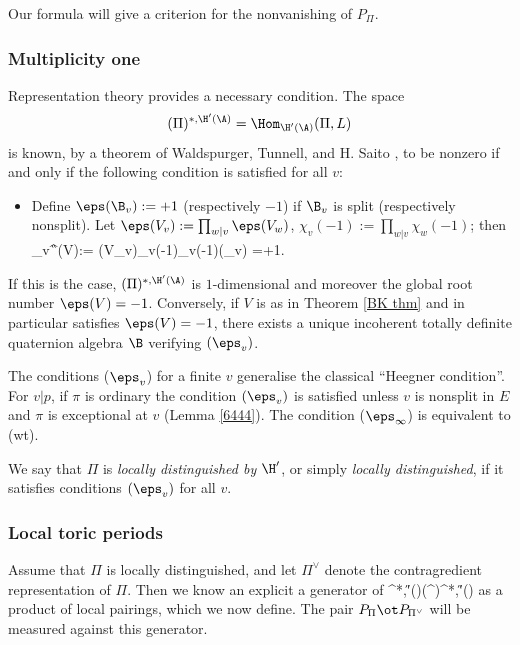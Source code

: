 Our formula will give a criterion for the nonvanishing of  $P_{\Pi}$.





\subsubsection{Multiplicity one} Representation theory provides a necessary condition.  The space
$$(\Pi)^{*,\H'(\A)}=\Hom_{\H'(\A)} (\Pi, L)$$
 is known, by a theorem of Waldspurger,  Tunnell, and H. Saito \cite{tunnell,saito-h}, to be nonzero if and  only if
the following condition is satisfied for all $v$:
\begin{itemize}
\item[($\eps_{v}$)]  Define $ \eps(\B_{v}):=+1 $ (respectively $-1$) if $\B_{v}$ is split (respectively nonsplit).  Let
$\eps(V_{v}):= \prod_{w\vert v}\eps(V_{w})$, $\chi_{v}(-1):=\prod_{w\vert v}\chi_{w}(-1)$; then
\beq \label{eps v}
\eps_{v}^{\G}(V):= \eps(V_{v})\chi_{v}(-1)\eta_{v}(-1)\eps(\B_{v}) =+1.
\eeq
\end{itemize}
If this is the  case, $(\Pi)^{*,\H'(\A)}$ is $1$-dimensional and moreover the global root number $\eps(V)=-1$.  Conversely, if $V$ is as in Theorem \ref{BK thm} and in particular  satisfies $\eps(V)=-1$, there exists a unique incoherent totally definite quaternion algebra $\B$ verifying $(\eps_{v})$.

 The conditions ($\eps_{v}$) for a finite $v$ generalise the classical ``Heegner condition''. For $v\vert p$, if $\pi$ is ordinary the condition $(\eps_{v})$  is satisfied  unless   $v$ is nonsplit in $E$ and $\pi$ is  exceptional at $v$ (Lemma \ref{6444}).
The condition ($\eps_{\infty}$)   is equivalent to (wt).
 \begin{defi}
\notready{}
 We say that $\Pi$ is \emph{locally distinguished by $\H'$}, or simply \emph{locally distinguished}, if it satisfies conditions $(\eps_{v}) $ for all $v$.
 \end{defi}


\subsubsection{Local toric periods} Assume that $\Pi$ is locally distinguished, and let $\Pi^{\vee}$ denote the contragredient representation of $\Pi$.  Then we know an explicit a generator of
\beq\label{pi*h}
\Pi^{*,\H'(\A)}\ot (\Pi^{\vee})^{*,\H'(\A)}
\eeq
as a product of local pairings, which we now define.
The  pair $P_{\Pi}\ot P_{\Pi^{\vee}}$ will be measured against this generator.



